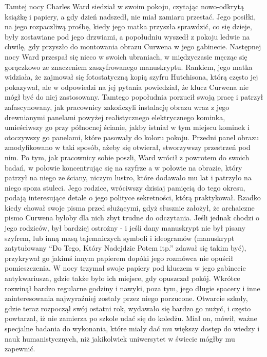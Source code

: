 Tamtej nocy Charles Ward siedział w swoim pokoju, czytając nowo-odkrytą książkę i papiery, a gdy dzień nadszedł, nie miał zamiaru przestać. Jego posiłki, na jego rozpaczliwą prośbę, kiedy jego matka przyszła sprawdzić, co się dzieje, były zostawiane pod jego drzwiami, a popołudniu wyszedł z pokoju ledwie na chwilę, gdy przyszło do montowania obrazu Curwena w jego gabinecie. Następnej nocy Ward przespał się nieco w swoich ubraniach, w międzyczasie męcząc się gorączkowo ze znaczeniem zaszyfrowanego manuskryptu. Rankiem, jego matka widziała, że zajmował się fotostatyczną kopią szyfru  Hutchisona, którą często jej pokazywał, ale w odpowiedzi na jej pytania powiedział, że klucz Curwena nie mógł być do niej zastosowany. Tamtego popołudnia porzucił swoją pracę i patrzył zafascynowany, jak pracownicy zakończyli instalację obrazu wraz z jego drewnianymi panelami powyżej realistycznego elektrycznego kominka, umieściwszy go przy północnej ścianie, jakby istniał w tym miejscu kominek i otoczywszy go panelami, które pasowały do koloru pokoju. Przedni panel obrazu zmodyfikowano w taki sposób, ażeby się otwierał, stworzywszy przestrzeń pod nim. Po tym, jak pracownicy sobie poszli, Ward wrócił z powrotem do swoich badań, w połowie koncentrując się na szyfrze a w połowie na obrazie, który patrzył na niego ze ściany, niczym lustro, które dodawało mu lat i patrzyło na niego spoza stuleci. Jego rodzice, wróciwszy dzisiaj pamięcią do tego okresu, podają interesujące detale o jego polityce sekretności, którą praktykował. Rzadko kiedy chował swoje pisma przed służącymi, gdyż słusznie założył, że archaiczne pismo Curwena byłoby dla nich zbyt trudne do odczytania. Jeśli jednak chodzi o jego rodziców, był bardziej ostrożny - i jeśli dany manuskrypt nie był pisany szyfrem, lub inną masą tajemniczych symboli i ideogramów (manuskrypt zatytułowany ``Do Tego, Który Nadejdzie Potem itp.'' zdawał się takim być), przykrywał go jakimś innym papierem dopóki jego rozmówca nie opuścił pomieszczenia. W nocy trzymał swoje papiery pod kluczem w jego gabinecie antykwariusza, gdzie także było ich miejsce, gdy opuszczał pokój. Wkrótce rozwinął bardzo regularne godziny i nawyki, poza tym, jego długie spacery i inne zainteresowania najwyraźniej zostały przez niego porzucone. Otwarcie szkoły, gdzie teraz rozpoczął swój ostatni rok, wydawało się bardzo go nużyć, i często powtarzał, iż nie zamierza po szkole udać się do koledżu. Miał on, mówił, ważne specjalne badania do wykonania, które miały dać mu większy dostęp do wiedzy i nauk humanistycznych, niż jakikolwiek uniwersytet w świecie mógłby mu zapewnić. 


